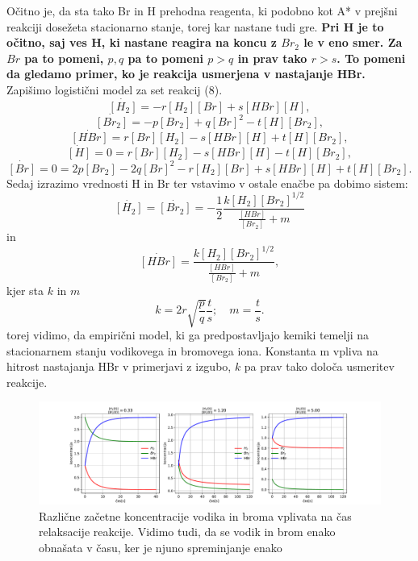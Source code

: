 \documentclass[11pt, a4paper]{article}
\begin{document}
Očitno je, da sta tako Br in H prehodna reagenta, ki podobno kot A* v prejšni reakciji dosežeta stacionarno stanje, torej kar nastane tudi gre. \textbf{Pri H je to očitno, saj ves H, ki nastane reagira na koncu z $Br_2$ le v eno smer. Za $Br$ pa to pomeni, $p,q$ pa to pomeni $p>q$ in prav tako $r>s$. To pomeni da gledamo primer, ko je reakcija usmerjena v nastajanje HBr.}\newline\newline
Zapišimo logistični model za set reakcij (8).
\[
\dot{[H_2]} = -r[H_2][Br]+s[HBr][H],
\]
\[
\dot{[Br_2]} =  -p[Br_2]+q[Br]^2-t[H][Br_2],
\]
\begin{equation}
\dot{[HBr]} = r[Br][H_2]-s[HBr][H]+t[H][Br_2],
\end{equation}
\[
\dot{[H]}=0=r[Br][H_2]-s[HBr][H]-t[H][Br_2],
\]
\[
\dot{[Br]}=0=2p[Br_2]-2q[Br]^2-r[H_2][Br]+s[HBr][H]+t[H][Br_2].
\]
Sedaj izrazimo vrednosti H in Br ter vstavimo v ostale enačbe pa dobimo sistem:
\begin{equation}
\dot{[H_2]}= \dot{[Br_2]}=- \frac{1}{2}\frac{k[H_2][Br_2]^{1/2}}{\frac{[HBr]}{[Br_2]}+m}
\end{equation}
in
\begin{equation}
\dot{[HBr]} =  \frac{k[H_2][Br_2]^{1/2}}{\frac{[HBr]}{[Br_2]}+m},
\end{equation}
kjer sta $k$ in $m$
\begin{equation}
k = 2r\sqrt{\frac{p}{q}}\frac{t}{s}; \quad m=\frac{t}{s}.
\end{equation}
torej vidimo, da empirični model, ki ga predpostavljajo kemiki temelji na stacionarnem stanju vodikovega in bromovega iona. Konstanta m vpliva na hitrost nastajanja HBr v primerjavi z izgubo, $k$ pa prav tako določa usmeritev reakcije. \newline\newline
\begin{figure}[H]
\hspace*{-2cm}     
  \includegraphics[width=20cm]{bromid_hitrost_relaksacije.pdf}
  \caption{Različne začetne koncentracije vodika in broma vplivata na čas relaksacije reakcije. Vidimo tudi, da se vodik in brom enako obnašata v času, ker je njuno spreminjanje enako } 
\end{figure}
\end{document}
